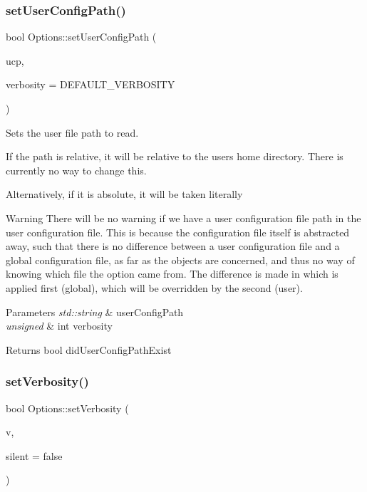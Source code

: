 \subsubsection{\texorpdfstring{setUserConfigPath()}{setUserConfigPath()}\hspace{0.1cm}{\footnotesize\ttfamily [2/2]}}
{\footnotesize\ttfamily bool Options\+::set\+User\+Config\+Path (\begin{DoxyParamCaption}\item[{std\+::string}]{ucp,  }\item[{unsigned int}]{verbosity = {\ttfamily DEFAULT\+\_\+VERBOSITY} }\end{DoxyParamCaption})}



Sets the user file path to read. 

If the path is relative, it will be relative to the user\textquotesingle{}s home directory. There is currently no way to change this.

Alternatively, if it is absolute, it will be taken literally

\begin{DoxyWarning}{Warning}
There will be no warning if we have a user configuration file path in the user configuration file. This is because the configuration file itself is abstracted away, such that there is no difference between a user configuration file and a global configuration file, as far as the objects are concerned, and thus no way of knowing which file the option came from. The difference is made in which is applied first (global), which will be overridden by the second (user).
\end{DoxyWarning}

\begin{DoxyParams}{Parameters}
{\em std\+::string} & user\+Config\+Path \\
\hline
{\em unsigned} & int verbosity\\
\hline
\end{DoxyParams}
\begin{DoxyReturn}{Returns}
bool did\+User\+Config\+Path\+Exist 
\end{DoxyReturn}
\mbox{\label{classOptions_a46fced99495928a6fc02fa16822dc49c}} 
\subsubsection{\texorpdfstring{setVerbosity()}{setVerbosity()}\hspace{0.1cm}{\footnotesize\ttfamily [1/4]}}
{\footnotesize\ttfamily bool Options\+::set\+Verbosity (\begin{DoxyParamCaption}\item[{unsigned int}]{v,  }\item[{bool}]{silent = {\ttfamily false} }\end{DoxyParamCaption})}



